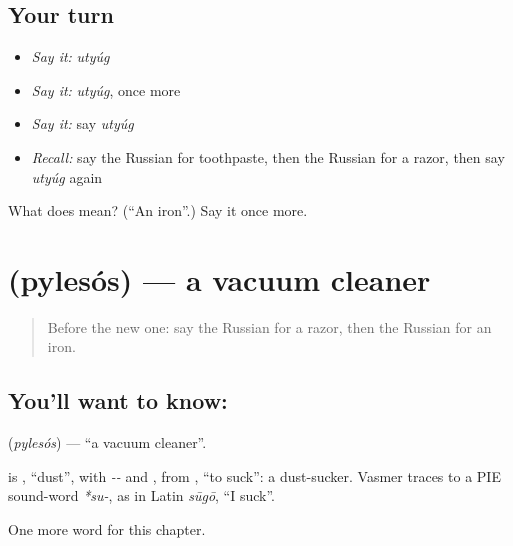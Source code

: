 \subsection*{Your turn}
\begin{itemize}
\raggedright
  \item \emph{Say it:} \emph{utyúg}
  \item \emph{Say it:} \emph{utyúg}, once more
  \item \emph{Say it:} say \emph{utyúg}
  \item \emph{Recall:} say the Russian for toothpaste, then the Russian for a razor, then say \emph{utyúg} again
\end{itemize}

\begin{tcolorbox}[breakable,colback=teal!4,colframe=teal!35!black,title={Before you move on}]
What does  mean? (\textquotedblleft{}An iron\textquotedblright{}.) Say it once more.
\end{tcolorbox}
\section[\texorpdfstring{\ru{пылесос} (pylesós)}{пылесос (pylesós)}]{ (pylesós) — a vacuum cleaner}

\label{lesson:RU-C219-pylesos}



\begin{quote}
Before the new one: say the Russian for a razor, then the Russian for an iron.
\end{quote}

\subsection*{You'll want to know: }
\textbf{} (\emph{pylesós}) — \textquotedblleft{}a vacuum cleaner\textquotedblright{}.

\begin{cousinweb}
\textbf{} is \emph{}, \textquotedblleft{}dust\textquotedblright{}, with \emph{--} and \emph{}, from \emph{}, \textquotedblleft{}to suck\textquotedblright{}: a dust-sucker. Vasmer traces \emph{} to a PIE sound-word \emph{*su-}, as in Latin \emph{sūgō}, \textquotedblleft{}I suck\textquotedblright{}.
\end{cousinweb}

\begin{grammarlens}[title={What you've built}]
One more word for this chapter.
\end{grammarlens}

